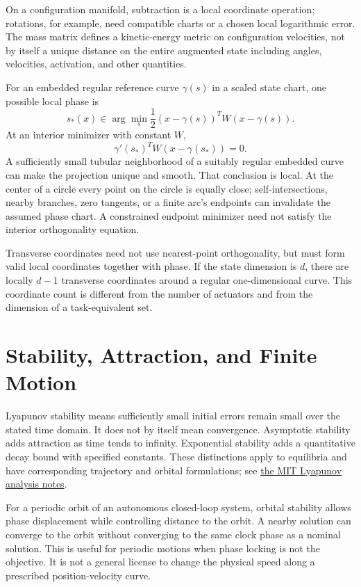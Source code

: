 On a configuration manifold, subtraction is a local coordinate operation;
rotations, for example, need compatible charts or a chosen local logarithmic
error. The mass matrix defines a kinetic-energy metric on configuration
velocities, not by itself a unique distance on the entire augmented state
including angles, velocities, activation, and other quantities.

For an embedded regular reference curve $\gamma(s)$ in a scaled state chart,
one possible local phase is
\begin{equation}
 s_*(x)\in\arg\min_s\frac12(x-\gamma(s))^TW(x-\gamma(s)).
 \label{eq:motion_projection_phase}
\end{equation}
At an interior minimizer with constant $W$,
\begin{equation}
 \gamma'(s_*)^TW(x-\gamma(s_*))=0.
 \label{eq:motion_phase_orthogonality}
\end{equation}
A sufficiently small tubular neighborhood of a suitably regular embedded curve
can make the projection unique and smooth. That conclusion is local. At the
center of a circle every point on the circle is equally close; self-intersections,
nearby branches, zero tangents, or a finite arc's endpoints can invalidate the
assumed phase chart. A constrained endpoint minimizer need not satisfy the
interior orthogonality equation.

Transverse coordinates need not use nearest-point orthogonality, but must form
valid local coordinates together with phase. If the state dimension is $d$,
there are locally $d-1$ transverse coordinates around a regular one-dimensional
curve. This coordinate count is different from the number of actuators and
from the dimension of a task-equivalent set.

\section{Stability, Attraction, and Finite Motion}

Lyapunov stability means sufficiently small initial errors remain small over
the stated time domain. It does not by itself mean convergence. Asymptotic
stability adds attraction as time tends to infinity. Exponential stability adds
a quantitative decay bound with specified constants. These distinctions apply
to equilibria and have corresponding trajectory and orbital formulations; see
\href{https://underactuated.mit.edu/lyapunov.html}{the MIT Lyapunov analysis notes}.

For a periodic orbit of an autonomous closed-loop system, orbital stability
allows phase displacement while controlling distance to the orbit. A nearby
solution can converge to the orbit without converging to the same clock phase
as a nominal solution. This is useful for periodic motions when phase locking
is not the objective. It is not a general license to change the physical speed
along a prescribed position-velocity curve.

